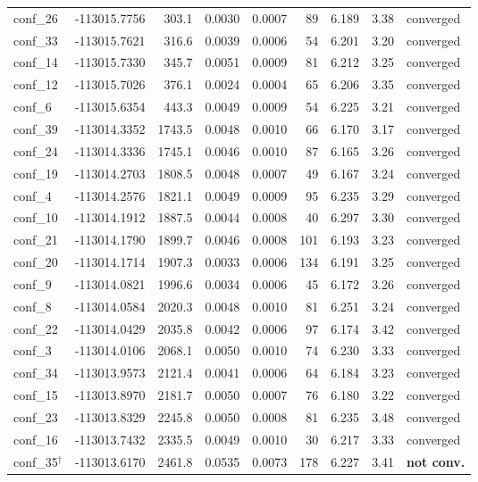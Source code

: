 \begin{longtable}{@{}lrrrrrrrl@{}}
conf\_26 & -113015.7756 & 303.1 & 0.0030 & 0.0007 & 89 & 6.189 & 3.38 & converged \\
conf\_33 & -113015.7621 & 316.6 & 0.0039 & 0.0006 & 54 & 6.201 & 3.20 & converged \\
conf\_14 & -113015.7330 & 345.7 & 0.0051 & 0.0009 & 81 & 6.212 & 3.25 & converged \\
conf\_12 & -113015.7026 & 376.1 & 0.0024 & 0.0004 & 65 & 6.206 & 3.35 & converged \\
conf\_6 & -113015.6354 & 443.3 & 0.0049 & 0.0009 & 54 & 6.225 & 3.21 & converged \\
conf\_39 & -113014.3352 & 1743.5 & 0.0048 & 0.0010 & 66 & 6.170 & 3.17 & converged \\
conf\_24 & -113014.3336 & 1745.1 & 0.0046 & 0.0010 & 87 & 6.165 & 3.26 & converged \\
conf\_19 & -113014.2703 & 1808.5 & 0.0048 & 0.0007 & 49 & 6.167 & 3.24 & converged \\
conf\_4 & -113014.2576 & 1821.1 & 0.0049 & 0.0009 & 95 & 6.235 & 3.29 & converged \\
conf\_10 & -113014.1912 & 1887.5 & 0.0044 & 0.0008 & 40 & 6.297 & 3.30 & converged \\
conf\_21 & -113014.1790 & 1899.7 & 0.0046 & 0.0008 & 101 & 6.193 & 3.23 & converged \\
conf\_20 & -113014.1714 & 1907.3 & 0.0033 & 0.0006 & 134 & 6.191 & 3.25 & converged \\
conf\_9 & -113014.0821 & 1996.6 & 0.0034 & 0.0006 & 45 & 6.172 & 3.26 & converged \\
conf\_8 & -113014.0584 & 2020.3 & 0.0048 & 0.0010 & 81 & 6.251 & 3.24 & converged \\
conf\_22 & -113014.0429 & 2035.8 & 0.0042 & 0.0006 & 97 & 6.174 & 3.42 & converged \\
conf\_3 & -113014.0106 & 2068.1 & 0.0050 & 0.0010 & 74 & 6.230 & 3.33 & converged \\
conf\_34 & -113013.9573 & 2121.4 & 0.0041 & 0.0006 & 64 & 6.184 & 3.23 & converged \\
conf\_15 & -113013.8970 & 2181.7 & 0.0050 & 0.0007 & 76 & 6.180 & 3.22 & converged \\
conf\_23 & -113013.8329 & 2245.8 & 0.0050 & 0.0008 & 81 & 6.235 & 3.48 & converged \\
conf\_16 & -113013.7432 & 2335.5 & 0.0049 & 0.0010 & 30 & 6.217 & 3.33 & converged \\
conf\_35$^{\dagger}$ & -113013.6170 & 2461.8 & 0.0535 & 0.0073 & 178 & 6.227 & 3.41 & \textbf{not conv.} \\

\end{longtable}
